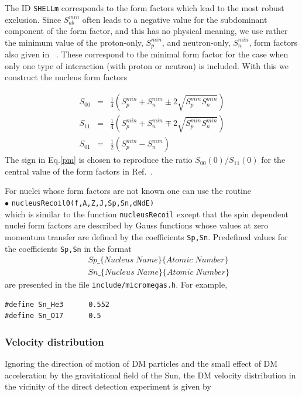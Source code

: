 \documentclass[12pt,a4paper]{article}
\begin{document}
The ID {\tt SHELLm} corresponds to the form factors which lead to the most robust exclusion.  
Since  $S_{ab}^{min}$ often leads to a negative value for the subdominant component of the form factor, and this has no physical meaning, we use rather  
the minimum value of  the proton-only, $S_p^{min}$,   and neutron-only, $S_n^{min}$,  form factors also given in ~\cite{Klos:2013rwa}. 
These  correspond to the minimal form factor for the case when only one type of interaction (with proton or neutron) is included. With this we construct  
the nucleus form factors 

\begin{eqnarray}
\label{pm}
  S_{00}&=& \frac{1}{4} \left(S_p^{min} +S_n^{min} \pm 2 \sqrt{S_p^{min} S_n^{min}}\right)\\
\nonumber
  S_{11}&=& \frac{1}{4}  \left(S_p^{min} +S_n^{min} \mp 2 \sqrt{S_p^{min} S_n^{min}}\right)\\
\nonumber
  S_{01}&=& \frac{1}{2}  (S_p^{min}-S_n^{min}) 
\end{eqnarray} 
The sign in Eq.\ref{pm} is chosen  to reproduce the  ratio $S_{00}(0)/{S}_{11}(0)$ for the central value of the form factors in Ref.~\cite{Klos:2013rwa}.

For nuclei whose form factors  are not known one can use the routine \\
\noindent
$\bullet$ \verb|nucleusRecoil0(f,A,Z,J,Sp,Sn,dNdE)|\\
which is similar to the  function \verb|nucleusRecoil| except that 
the spin dependent nuclei form factors are described by Gauss functions \cite{Belanger:2008sj}
whose values  at zero momentum transfer are defined by the coefficients \verb|Sp,Sn|. 
Predefined values for the coefficients \verb|Sp,Sn| in the format
\begin{eqnarray}
    &&Sp\_\{Nucleus\; Name\}\{Atomic \;Number\} \nonumber\\
    &&Sn\_\{Nucleus\; Name\}\{Atomic\; Number\} \nonumber
\end{eqnarray}
 are presented in the file  \verb|include/micromegas.h|. For example, 
\begin{verbatim}
#define Sn_He3      0.552
#define Sn_O17      0.5
\end{verbatim}

\subsubsection{Velocity distribution}

Ignoring the  direction of motion of DM particles and  the small effect of DM acceleration by the gravitational field of the Sun,
the DM velocity distribution in the vicinity  of the direct detection experiment is given by
\end{document}
